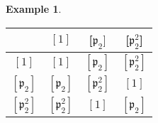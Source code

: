 \documentclass[11pt,a4paper]{report}
\theoremstyle{plain}
\theoremstyle{definition}
\newtheorem{exmp}[subsection]{Example}
\theoremstyle{definition}
\def\gothp{\mathfrak{p}}
\begin{document}
\begin{exmp}
		
		
		
		
		\begin{center}
			\begin{tabu} {|c| c c c |}
				\hline
				&$[1]$&[$\gothp_2]$&[$\gothp_2^2$]\\
				\hline
				$[1]$&$[1]$&$[\gothp_2]$&$[\gothp_2^2]$\\
				$[\gothp_2]$&$[\gothp_2] $& $[\gothp_2^2]$&$[1]$\\
				$[\gothp_2^2]$&$[\gothp_2^2]$&$[1]$&$[\gothp_2]$\\
				\hline
			\end{tabu}
		\end{center}
		
		
		
	\end{exmp}
	
\end{document}
